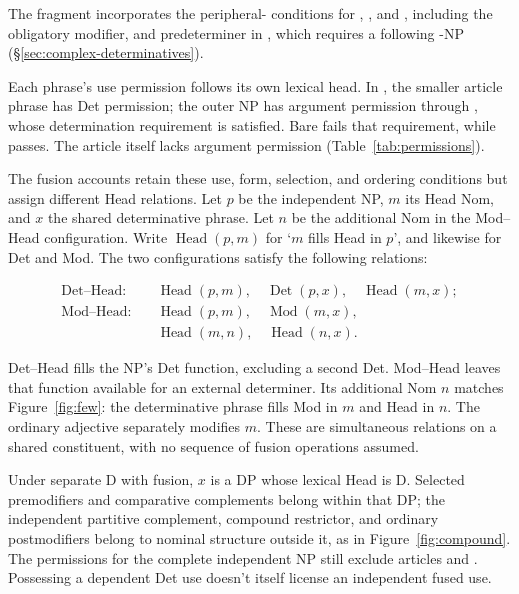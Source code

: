 \documentclass[12pt]{article}
\begin{document}
The fragment incorporates the peripheral- conditions for , , and , including the obligatory modifier, and predeterminer  in , which requires a following -NP (§\ref{sec:complex-determinatives}).

Each phrase's use permission follows its own lexical head. In , the smaller article phrase has Det permission; the outer NP has argument permission through , whose determination requirement is satisfied. Bare  fails that requirement, while  passes. The article itself lacks argument permission (Table~\ref{tab:permissions}).

The fusion accounts retain these use, form, selection, and ordering conditions but assign different Head relations. Let $p$ be the independent NP, $m$ its Head Nom, and $x$ the shared determinative phrase. Let $n$ be the additional Nom in the Mod--Head configuration. Write $\operatorname{Head}(p,m)$ for \enquote*{$m$ fills Head in $p$}, and likewise for Det and Mod. The two configurations satisfy the following relations:

\[
\begin{aligned}
\text{Det--Head:}\quad
 &\operatorname{Head}(p,m),\quad \operatorname{Det}(p,x),\quad \operatorname{Head}(m,x); \\
\text{Mod--Head:}\quad
 &\operatorname{Head}(p,m),\quad \operatorname{Mod}(m,x),\\
 &\operatorname{Head}(m,n),\quad \operatorname{Head}(n,x).
\end{aligned}
\]

Det--Head fills the NP's Det function, excluding a second Det. Mod--Head leaves that function available for an external determiner. Its additional Nom $n$ matches Figure~\ref{fig:few}: the determinative phrase fills Mod in $m$ and Head in $n$. The ordinary adjective  separately modifies $m$. These are simultaneous relations on a shared constituent, with no sequence of fusion operations assumed.

Under separate D with fusion, $x$ is a DP whose lexical Head is D. Selected premodifiers and comparative complements belong within that DP; the independent partitive complement, compound restrictor, and ordinary postmodifiers belong to nominal structure outside it, as in Figure~\ref{fig:compound}. The permissions for the complete independent NP still exclude articles and . Possessing a dependent Det use doesn't itself license an independent fused use.
\end{document}
